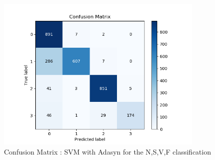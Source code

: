 \documentclass[LaM,binding=0.6cm]{sapthesis}
\begin{document}
\begin{figure}[H]  \centering
    \includegraphics[width=100mm,scale=0.7]{confusion-matrix-linear-not-linear-adasyn-smaller-test.png}
    \caption{Confusion Matrix : SVM with Adasyn for the N,S,V,F classification}
    \label{fig:svc3}
\end{figure}
\end{document}

